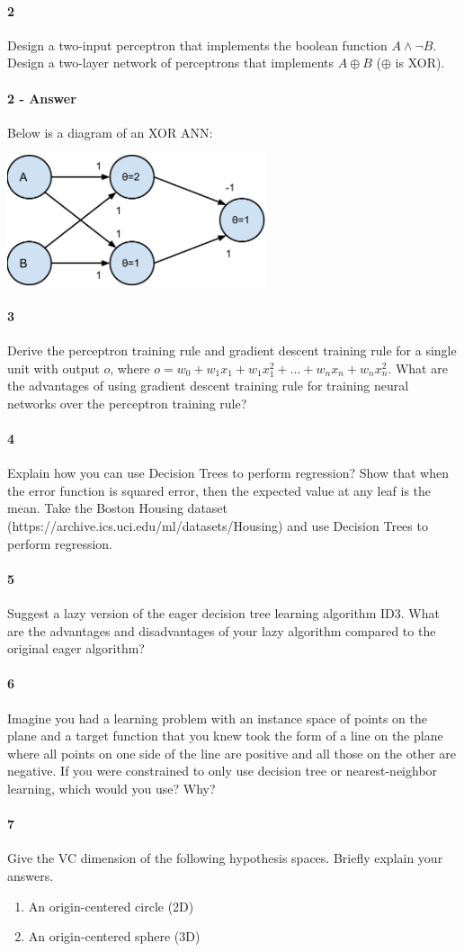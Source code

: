\documentclass[10pt,letter]{article}
\begin{document}
\paragraph{2} Design a two-input perceptron that implements the boolean function $A \land \lnot B$. Design a two-layer network of perceptrons that implements $A \oplus B$ ($\oplus$ is XOR).

\paragraph{2 - Answer} Below is a diagram of an XOR ANN:

\includegraphics[width=3in]{xor_ann.pdf}

\paragraph{3} Derive the perceptron training rule and gradient descent training rule for a single unit with output $o$, where $o = w_0 + w_1x_1 + w_1x_1^2 + … + w_nx_n + w_nx_n^2$. What are the advantages of using gradient descent training rule for training neural networks over the perceptron training rule?


\paragraph{4} Explain how you can use Decision Trees to perform regression? Show that when the error function is squared error, then the expected value at any leaf is the mean. Take the Boston Housing dataset (https://archive.ics.uci.edu/ml/datasets/Housing) and use Decision Trees to perform regression. 

\paragraph{5} Suggest a lazy version of the eager decision tree learning algorithm ID3. What are the advantages and disadvantages of your lazy algorithm compared to the original eager algorithm?

\paragraph{6} Imagine you had a learning problem with an instance space of points on the plane and a target function that you knew took the form of a line on the plane where all points on one side of the line are positive and all those on the other are negative. If you were constrained to only use decision tree or nearest-neighbor learning, which would you use? Why?

\paragraph{7} Give the VC dimension of the following hypothesis spaces. Briefly explain your answers.
\begin{enumerate}
  \item An origin-centered circle (2D)
  \item An origin-centered sphere (3D)
\end{enumerate}
\end{document}
